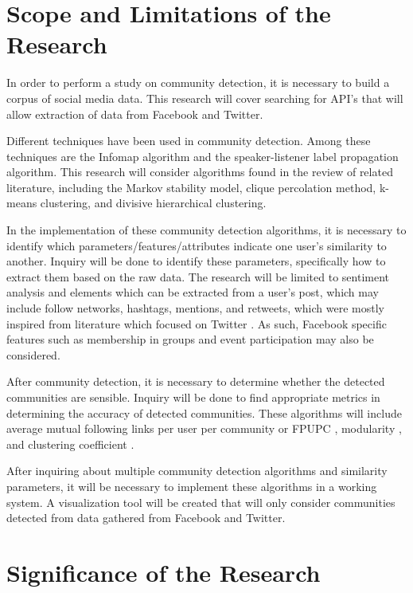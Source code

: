 \section{Scope and Limitations of the Research}
\label{sec:scopelimitations}

In order to perform a study on community detection, it is necessary to build a corpus of social media data. This research will cover searching for API's that will allow extraction of data from Facebook and Twitter.

Different techniques have been used in community detection. Among these techniques are the Infomap algorithm and the speaker-listener label propagation algorithm.  This research will consider algorithms found in the review of related literature, including the Markov stability model, clique percolation method, k-means clustering, and divisive hierarchical clustering.

In the implementation of these community detection algorithms, it is necessary to identify which parameters/features/attributes indicate one user’s similarity to another. Inquiry will be done to identify these parameters, specifically how to extract them based on the raw data. The research will be limited to sentiment analysis and elements which can be extracted from a user’s post, which may include follow networks, hashtags, mentions, and retweets, which were mostly inspired from literature which focused on Twitter \cite{Deitrick:2013,Zhang:2012,Lim:2012:1}. As such, Facebook specific features such as membership in groups and event participation may also be considered.

After community detection, it is necessary to determine whether the detected communities are sensible. Inquiry will be done to find appropriate metrics in determining the accuracy of detected communities. These algorithms will include average mutual following links per user per community or FPUPC \cite{Zhang:2012}, modularity \cite{Deitrick:2013}, and clustering coefficient \cite{Lim:2012:1}.

After inquiring about multiple community detection algorithms and similarity parameters, it will be necessary to implement these algorithms in a working system. A visualization tool will be created that will only consider communities detected from data gathered from Facebook and Twitter.

\section{Significance of the Research}
\label{sec:significance}


